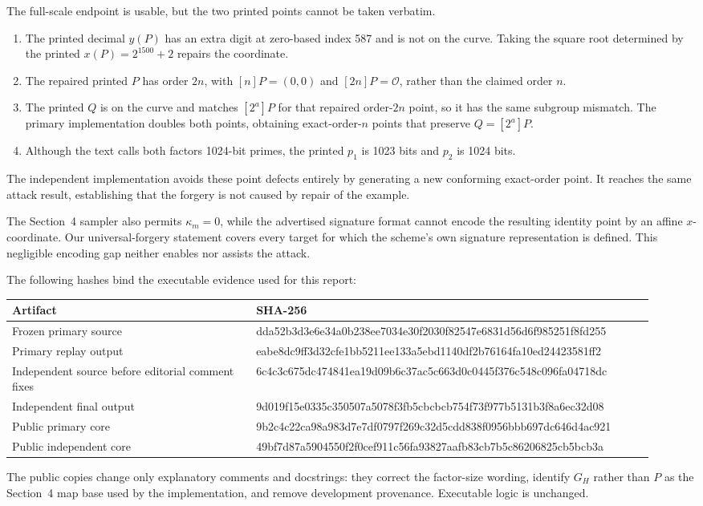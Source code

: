 \documentclass[10pt,a4paper]{article}
\newcommand{\Opoint}{\mathcal{O}}
\newcommand{\GH}{G_H}
\begin{document}
The full-scale endpoint is usable, but the two printed points cannot be taken
verbatim.
\begin{enumerate}
  \item The printed decimal $y(P)$ has an extra digit at zero-based index 587
  and is not on the curve.  Taking the square root determined by the printed
  $x(P)=2^{1500}+2$ repairs the coordinate.
  \item The repaired printed $P$ has order $2n$, with
  $[n]P=(0,0)$ and $[2n]P=\Opoint$, rather than the claimed order $n$.
  \item The printed $Q$ is on the curve and matches $[2^a]P$ for that repaired
  order-$2n$ point, so it has the same subgroup mismatch.  The primary
  implementation doubles both points, obtaining exact-order-$n$ points that
  preserve $Q=[2^a]P$.
  \item Although the text calls both factors 1024-bit primes, the printed
  $p_1$ is 1023 bits and $p_2$ is 1024 bits.
\end{enumerate}
The independent implementation avoids these point defects entirely by
generating a new conforming exact-order point.  It reaches the same attack
result, establishing that the forgery is not caused by repair of the example.

The Section~4 sampler also permits $\kappa_m=0$, while the advertised
signature format cannot encode the resulting identity point by an affine
$x$-coordinate.  Our universal-forgery statement covers every target for
which the scheme's own signature representation is defined.  This negligible
encoding gap neither enables nor assists the attack.

The following hashes bind the executable evidence used for this report:
\begin{center}
\small
\begin{tabular}{@{}p{0.35\linewidth}p{0.58\linewidth}@{}}
\toprule
Artifact & SHA-256 \\
\midrule
Frozen primary source & {\scriptsize\ttfamily dda52b3d3e6e34a0b238ee7034e30f2030f82547e6831d56d6f985251f8fd255} \\
Primary replay output & {\scriptsize\ttfamily eabe8dc9ff3d32cfe1bb5211ee133a5ebd1140df2b76164fa10ed24423581ff2} \\
Independent source before editorial comment fixes & {\scriptsize\ttfamily 6c4c3c675dc474841ea19d09b6c37ac5c663d0c0445f376c548c096fa04718dc} \\
Independent final output & {\scriptsize\ttfamily 9d019f15e0335c350507a5078f3fb5cbcbcb754f73f977b5131b3f8a6ec32d08} \\
Public primary core & {\scriptsize\ttfamily 9b2c4c22ca98a983d7e7df0797f269c32d5cdd838f0956bbb697dc646d4ac921} \\
Public independent core & {\scriptsize\ttfamily 49bf7d87a5904550f2f0cef911c56fa93827aafb83cb7b5c86206825cb5bcb3a} \\
\bottomrule
\end{tabular}
\end{center}
The public copies change only explanatory comments and docstrings: they
correct the factor-size wording, identify $\GH$ rather than $P$ as the
Section~4 map base used by the implementation, and remove development
provenance.  Executable logic is unchanged.
\end{document}
